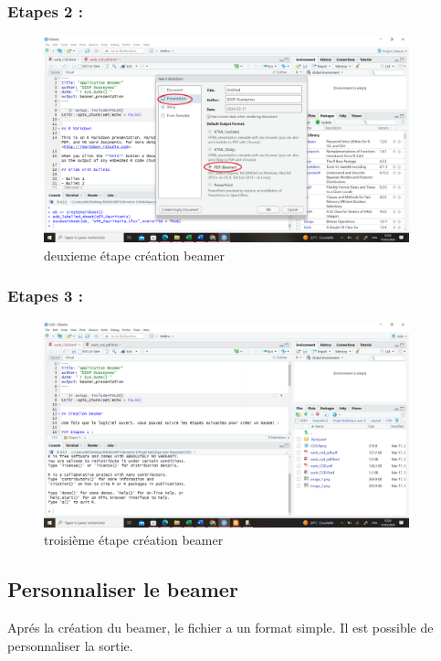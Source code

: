 \documentclass[
  12pt,
]{article}
\begin{document}
\subsubsection{Etapes 2 :}\label{etapes-2}

\begin{figure}
\centering
\includegraphics[width=4.16667in,height=\textheight]{image_2}
\caption{deuxieme étape création beamer}
\end{figure}

\newpage

\subsubsection{Etapes 3 :}\label{etapes-3}

\begin{figure}
\centering
\includegraphics[width=4.16667in,height=\textheight]{image_3}
\caption{troisième étape création beamer}
\end{figure}

\subsection{Personnaliser le beamer}\label{personnaliser-le-beamer}

Aprés la création du beamer, le fichier a un format simple. Il est
possible de personnaliser la sortie.
\end{document}
